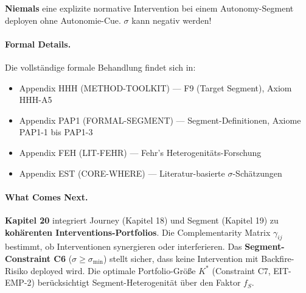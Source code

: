 \begin{tcolorbox}[colback=red!10!white, colframe=red!75!black,
    title=The Golden Rule of Segment Targeting]
\textbf{Niemals} eine explizite normative Intervention bei einem Autonomy-Segment deployen ohne Autonomie-Cue. $\sigma$ kann negativ werden!
\end{tcolorbox}

\paragraph{Formal Details.}
Die vollständige formale Behandlung findet sich in:
\begin{itemize}[nosep]
\item Appendix HHH (METHOD-TOOLKIT) --- F9 (Target Segment), Axiom HHH-A5
\item Appendix PAP1 (FORMAL-SEGMENT) --- Segment-Definitionen, Axiome PAP1-1 bis PAP1-3
\item Appendix FEH (LIT-FEHR) --- Fehr's Heterogenitäts-Forschung
\item Appendix EST (CORE-WHERE) --- Literatur-basierte $\sigma$-Schätzungen
\end{itemize}

\paragraph{What Comes Next.}
\textbf{Kapitel 20} integriert Journey (Kapitel 18) und Segment (Kapitel 19) zu \textbf{kohärenten Interventions-Portfolios}. Die Complementarity Matrix $\gamma_{ij}$ bestimmt, ob Interventionen synergieren oder interferieren. Das \textbf{Segment-Constraint C6} ($\sigma \geq \sigma_{\min}$) stellt sicher, dass keine Intervention mit Backfire-Risiko deployed wird. Die optimale Portfolio-Größe $K^*$ (Constraint C7, EIT-EMP-2) berücksichtigt Segment-Heterogenität über den Faktor $f_S$.



